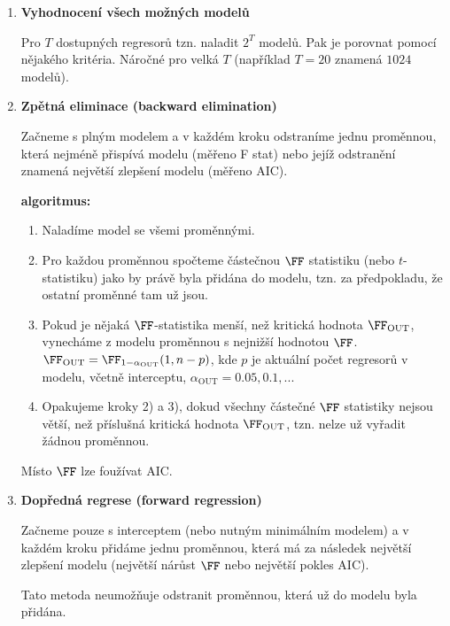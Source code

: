 \begin{enumerate}[1)]

\item
\textbf{Vyhodnocení všech možných modelů}

Pro $T$ dostupných regresorů tzn. naladit $2^T$ modelů. Pak je porovnat pomocí nějakého kritéria. Náročné pro velká $T$ (například $T = 20$ znamená $1024$ modelů).

\item
\textbf{Zpětná eliminace (backward elimination)}

Začneme s plným modelem a v každém kroku odstraníme jednu proměnnou, která nejméně přispívá modelu (měřeno F stat) nebo jejíž odstranění znamená největší zlepšení modelu (měřeno AIC).

\textbf{algoritmus:}
\begin{enumerate}[	1)]
	\item Naladíme model se všemi proměnnými.
	\item Pro každou proměnnou spočteme částečnou $\FF$ statistiku (nebo $t$-statistiku) jako by právě byla přidána do modelu, tzn. za předpokladu, že ostatní proměnné tam už jsou.
	\item Pokud je nějaká $\FF$-statistika menší, než kritická hodnota $\FF_\mathrm{OUT}$, vynecháme z modelu proměnnou s nejnižší hodnotou $\FF$. $\FF_\mathrm{OUT}=\FF_{1-\alpha_\mathrm{OUT}}(1,n-p)$, kde $p$ je aktuální počet regresorů v modelu, včetně interceptu, $\alpha_\text{OUT}=0.05,0.1,...$
	\item Opakujeme kroky 2) a 3), dokud všechny částečné $\FF$ statistiky nejsou větší, než příslušná kritická hodnota $\FF_\mathrm{OUT}$, tzn. nelze už vyřadit žádnou proměnnou.
\end{enumerate}
\begin{remark}
	Místo $\FF$ lze foužívat AIC.
\end{remark}

\item
\textbf{Dopředná regrese (forward regression)}

Začneme pouze s interceptem (nebo nutným minimálním modelem) a v každém kroku přidáme jednu proměnnou, která má za následek největší zlepšení modelu (největší nárůst $\FF$ nebo největší pokles AIC). 

Tato metoda neumožňuje odstranit proměnnou, která už do modelu byla přidána.


\end{enumerate}
